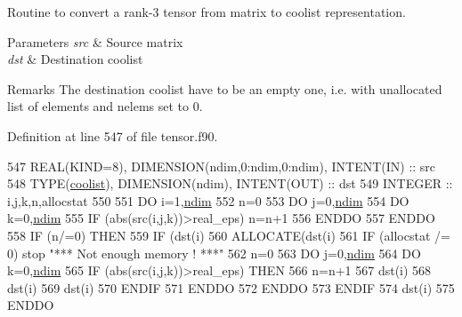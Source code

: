 Routine to convert a rank-\/3 tensor from matrix to coolist representation. 


\begin{DoxyParams}{Parameters}
{\em src} & Source matrix \\
\hline
{\em dst} & Destination coolist \\
\hline
\end{DoxyParams}
\begin{DoxyRemark}{Remarks}
The destination coolist have to be an empty one, i.\+e. with unallocated list of elements and nelems set to 0. 
\end{DoxyRemark}


Definition at line 547 of file tensor.\+f90.


\begin{DoxyCode}
547     \textcolor{keywordtype}{REAL(KIND=8)}, \textcolor{keywordtype}{DIMENSION(ndim,0:ndim,0:ndim)}, \textcolor{keywordtype}{INTENT(IN)} :: src
548     \textcolor{keywordtype}{TYPE}(\hyperlink{structtensor_1_1coolist}{coolist}), \textcolor{keywordtype}{DIMENSION(ndim)}, \textcolor{keywordtype}{INTENT(OUT)} :: dst
549     \textcolor{keywordtype}{INTEGER} :: i,j,k,n,allocstat
550     
551     \textcolor{keywordflow}{DO} i=1,\hyperlink{namespaceparams_a2323fe1773f086e20c14f266351c482b}{ndim}
552        n=0
553        \textcolor{keywordflow}{DO} j=0,\hyperlink{namespaceparams_a2323fe1773f086e20c14f266351c482b}{ndim}
554           \textcolor{keywordflow}{DO} k=0,\hyperlink{namespaceparams_a2323fe1773f086e20c14f266351c482b}{ndim}
555              \textcolor{keywordflow}{IF} (abs(src(i,j,k))>real\_eps) n=n+1
556 \textcolor{keywordflow}{          ENDDO}
557 \textcolor{keywordflow}{       ENDDO}
558        \textcolor{keywordflow}{IF} (n/=0) \textcolor{keywordflow}{THEN}
559           \textcolor{keywordflow}{IF} (dst(i)%
560           \textcolor{keyword}{ALLOCATE}(dst(i)%
561           \textcolor{keywordflow}{IF} (allocstat /= 0) stop \textcolor{stringliteral}{"*** Not enough memory ! ***"}
562           n=0
563           \textcolor{keywordflow}{DO} j=0,\hyperlink{namespaceparams_a2323fe1773f086e20c14f266351c482b}{ndim}
564              \textcolor{keywordflow}{DO} k=0,\hyperlink{namespaceparams_a2323fe1773f086e20c14f266351c482b}{ndim}
565                 \textcolor{keywordflow}{IF} (abs(src(i,j,k))>real\_eps) \textcolor{keywordflow}{THEN}
566                    n=n+1
567                    dst(i)%
568                    dst(i)%
569                    dst(i)%
570 \textcolor{keywordflow}{                ENDIF}
571 \textcolor{keywordflow}{             ENDDO}
572 \textcolor{keywordflow}{          ENDDO}
573 \textcolor{keywordflow}{       ENDIF}
574        dst(i)%
575 \textcolor{keywordflow}{    ENDDO}
\end{DoxyCode}
